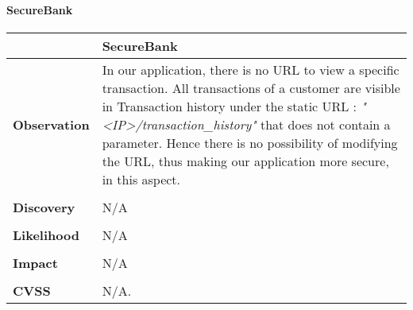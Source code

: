 \paragraph{SecureBank} \mbox{}
\begin{longtable*}{p{.20\textwidth} | p{.80\textwidth}}
    \hline
    & \textbf{SecureBank} \\
    \hline
    \textbf{Observation} &
       In our application, there is no URL to view a specific transaction. All transactions of a customer are visible in Transaction history under the static URL :
       \textit{"<IP>/transaction\_history"} that does not contain a parameter. Hence there is no possibility of modifying the URL, thus making our application more secure, in this aspect.
    \\\\
    \textbf{Discovery} &
   		N/A
    \\\\
    \textbf{Likelihood} &
	   N/A
    \\\\
    \textbf{Impact} &
  		N/A
    \\\\
    \textbf{CVSS} &
       N/A.
    \\
    \hline
\end{longtable*}
\clearpage